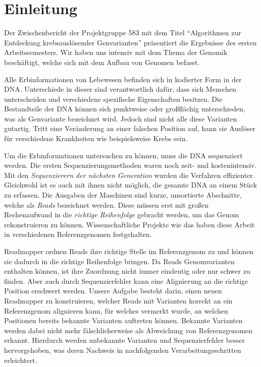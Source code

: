 \chapter{Einleitung}
\label{sec:einleitung}

Der Zwischenbericht der Projektgruppe 583 mit dem Titel "`Algorithmen zur Entdeckung krebsauslösender Genvarianten"' präsentiert die Ergebnisse des ersten Arbeitssemesters. Wir haben uns intensiv mit dem Thema der Genomik beschäftigt, welche sich mit dem Aufbau von Genomen befasst.

Alle Erbinformationen von Lebewesen befinden sich in kodierter Form in der DNA. Unterschiede in dieser sind verantwortlich dafür, dass sich Menschen unterscheiden und verschiedene spezifische Eigenschaften besitzen. Die Bestandteile der DNA können sich punktweise oder großflächig unterschieden, was als Genvariante bezeichnet wird. Jedoch sind nicht alle diese Varianten gutartig. Tritt eine Veränderung an einer falschen Position auf, kann sie Auslöser für verschiedene Krankheiten wie beispielsweise Krebs sein.

Um die Erbinformationen untersuchen zu können, muss die DNA sequenziert werden. Die ersten Sequenzierungsmethoden waren noch zeit- und kostenintensiv. Mit den \textit{Sequenzierern der nächsten Generation} wurden die Verfahren effizienter. Gleichwohl ist es auch mit ihnen nicht möglich, die gesamte DNA an einem Stück zu erfassen. Die Ausgaben der Maschinen sind kurze, unsortierte Abschnitte, welche als \textit{Reads} bezeichnet werden. Diese müssen erst mit großen Rechenaufwand in die \textit{richtige Reihenfolge} gebracht werden, um das Genom rekonstruieren zu können. Wissenschaftliche Projekte wie das \citet{1000Genomes} haben diese Arbeit in verschiedenen Referenzgenomen festgehalten.

Readmapper ordnen Reads ihre richtige Stelle im Referenzgenom zu und können sie dadurch in die richtige Reihenfolge bringen. Da Reads Genomvarianten enthalten können, ist ihre Zuordnung nicht immer eindeutig oder nur schwer zu finden. Aber auch durch Sequenzierfehler kann eine Alignierung an die richtige Position erschwert werden. Unsere Aufgabe besteht darin, einen neuen Readmapper zu konstruieren, welcher Reads mit Varianten korrekt an ein Referenzgenom alignieren kann, für welches vermerkt wurde, an welchen Positionen bereits bekannte Varianten auftreten können. Bekannte Varianten werden dabei nicht mehr fälschlicherweise als Abweichung von Referenzgenomen erkannt. Hierdurch werden unbekannte Varianten und Sequenzierfehler besser hervorgehoben, was deren Nachweis in nachfolgenden Verarbeitungsschritten erleichtert.

